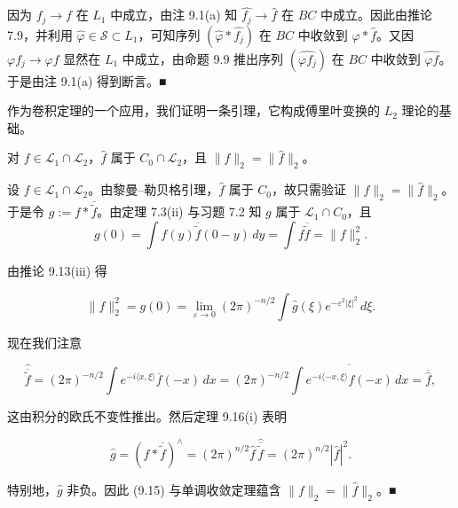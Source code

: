 \begin{theorem}
因为 $ f_j \to f $ 在 $ L_1 $ 中成立，由注 9.1(a) 知 $ \widehat{f_j} \to \widehat{f} $ 在 $ BC $ 中成立。因此由推论 7.9，并利用 $ \widehat{\varphi} \in \mathcal{S} \subset L_1 $，可知序列 $ (\widehat{\varphi}*\widehat{f_j}) $ 在 $ BC $ 中收敛到 $ \widehat{\varphi}*\widehat{f} $。又因 $ \varphi f_j \to \varphi f $ 显然在 $ L_1 $ 中成立，由命题 9.9 推出序列 $ (\widehat{\varphi f_j}) $ 在 $ BC $ 中收敛到 $ \widehat{\varphi f} $。于是由注 9.1(a) 得到断言。\nobreak\hspace{0.35em}■

\end{theorem}

作为卷积定理的一个应用，我们证明一条引理，它构成傅里叶变换的 $ L_2 $ 理论的基础。

\begin{lemma}

对 $ f \in \mathcal{L}_1\cap\mathcal{L}_2 $，$ \widehat{f} $ 属于 $ C_0\cap\mathcal{L}_2 $，且 $ \|f\|_2 = \|\widehat{f}\|_2 $。

\proofhead
设 $ f \in \mathcal{L}_1\cap\mathcal{L}_2 $。由黎曼–勒贝格引理，$ \widehat{f} $ 属于 $ C_0 $，故只需验证 $ \|f\|_2 = \|\widehat{f}\|_2 $。于是令 $ g := f*\overline{\widetilde{f}} $。由定理 7.3(ii) 与习题 7.2 知 $ g $ 属于 $ \mathcal{L}_1\cap C_0 $，且
\[
g(0) = \int f(y)\overline{\widetilde{f}}(0-y)\,dy = \int f\overline{\widetilde{f}} = \|f\|_2^2 .
\]

由推论 9.13(iii) 得

\begin{equation}
\|f\|_2^2 = g(0) = \lim_{\varepsilon\to0}(2\pi)^{-n/2}\int\widehat{g}(\xi)e^{-\varepsilon^2|\xi|^2}\,d\xi .\tag{9.15}
\end{equation}

现在我们注意

\[
\widehat{\overline{\widetilde{f}}} = (2\pi)^{-n/2}\int e^{-i\langle x,\xi\rangle}\overline{f}(-x)\,dx = (2\pi)^{-n/2}\overline{\int e^{-i\langle -x,\xi\rangle}f(-x)\,dx} = \overline{\widehat{f}} ,
\]

这由积分的欧氏不变性推出。然后定理 9.16(i) 表明

\[
\widehat{g} = (f*\overline{\widetilde{f}})^{\wedge} = (2\pi)^{n/2}\widehat{f}\,\widehat{\overline{\widetilde{f}}} = (2\pi)^{n/2}|\widehat{f}|^2 .
\]

特别地，$ \widehat{g} $ 非负。因此 (9.15) 与单调收敛定理蕴含 $ \|f\|_2 = \|\widehat{f}\|_2 $。\nobreak\hspace{0.35em}■

\end{lemma}

